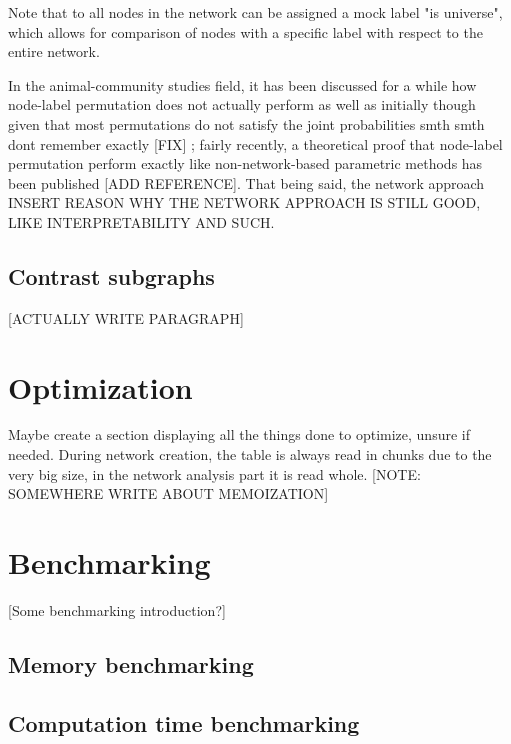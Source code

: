 Note that to all nodes in the network can be assigned a mock label "is universe", which allows for comparison of nodes with a specific label with respect to the entire network.

In the animal-community studies field, it has been discussed for a while how node-label permutation does not actually perform as well as initially though given that most permutations do not satisfy the joint probabilities smth smth dont remember exactly [FIX] \cite{nullmodel2017}; fairly recently, a theoretical proof that node-label permutation perform exactly like non-network-based parametric methods has been published [ADD REFERENCE]. That being said, the network approach INSERT REASON WHY THE NETWORK APPROACH IS STILL GOOD, LIKE INTERPRETABILITY AND SUCH.

\subsection{Contrast subgraphs}
[ACTUALLY WRITE PARAGRAPH]

\section{Optimization}
Maybe create a section displaying all the things done to optimize, unsure if needed.
During network creation, the table is always read in chunks due to the very big size, in the network analysis part it is read whole.
[NOTE: SOMEWHERE WRITE ABOUT MEMOIZATION]

\section{Benchmarking}
[Some benchmarking introduction?]

\subsection{Memory benchmarking}

\subsection{Computation time benchmarking}

